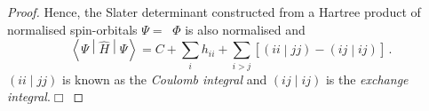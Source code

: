 \documentclass{article}
\theoremstyle{plain}\theoremheaderfont{\normalfont\itshape}\theorembodyfont{\rmfamily}\theoremseparator{.}\newtheorem*{rem}{Remark}\newtheorem*{ex}{Example}\newtheorem*{proof}{Proof}\newtheorem*{altp}{Alternative proof}
\theoremstyle{plain}\theoremheaderfont{\normalfont\bfseries}\theorembodyfont{\rmfamily}\theoremseparator{.}\newtheorem{thm}{Theorem}[section]\newtheorem{lem}[thm]{Lemma}\newtheorem{prop}[thm]{Proposition}\newtheorem*{cor}{Corollary}\newtheorem{defn}[thm]{Definition}\newtheorem{clm}[thm]{Claim}\newtheorem{clminproof}{Claim}
\theoremstyle{break}\theoremheaderfont{\normalfont\itshape}\theorembodyfont{\rmfamily}\theoremseparator{.\medskip}\newtheorem*{proofskip}{Proof}\newtheorem*{exs}{Examples}\newtheorem*{rems}{Remarks}
\theoremstyle{break}\theoremheaderfont{\normalfont\bfseries}\theorembodyfont{\rmfamily}\theoremseparator{.\medskip}\newtheorem{lemskip}[thm]{Lemma}\newtheorem{defnskip}[thm]{Definition}\newtheorem{propskip}[thm]{Proposition}\newtheorem{thmskip}[thm]{Theorem}
\numberwithin{equation}{section}
\newcommand{\qed}{\hfill\ensuremath{\Box}}
\newcommand{\expval}[2]{\left\langle #2 \middle| #1 \middle| #2 \right\rangle}
\newcommand{\bracket}[2]{\left( #1 \middle| #2 \right)}
\DeclareMathOperator{\antisymm}{\hat{\mathcal{A}}}
\begin{document}
\begin{proof}
        Hence, the Slater determinant constructed from a Hartree product of normalised spin-orbitals \(\Psi=\antisymm\Phi\) is also normalised and
        \begin{equation}
            \expval{\hat{H}}{\Psi}=C+\sum_i h_{ii}+\sum_{i>j}[\bracket{ii}{jj}-\bracket{ij}{ij}]\,.
        \end{equation}
        \(\bracket{ii}{jj}\) is known as the \textit{Coulomb integral} and \(\bracket{ij}{ij}\) is the \textit{exchange integral}.\qed
    \end{proof}

\end{document}
